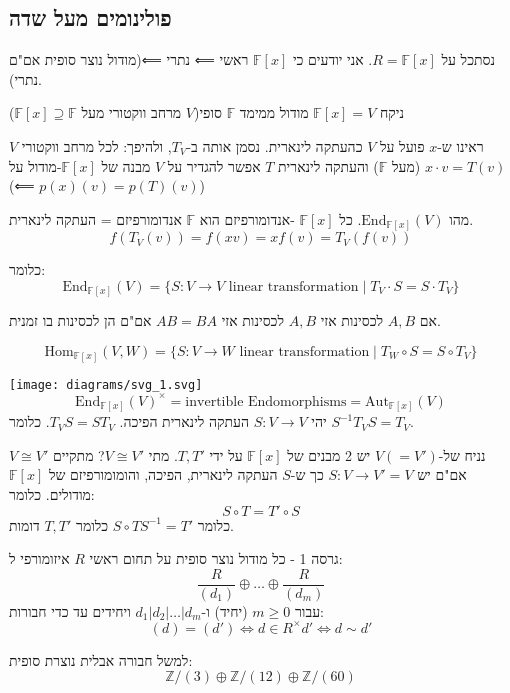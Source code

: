 \documentclass{tstextbook}
\begin{document}
\subsection{פולינומים מעל שדה}

נסתכל על \(R=\mathbb{F}[x]\). אני יודעים כי \(\mathbb{F}[x]\) ראשי ⟸ נתרי ⟸(מודול נוצר סופית אם"ם נתרי).

ניקח \(\mathbb{F}[x]=V\) מודול ממימד \(\mathbb{F}\) סופי(\(V\) מרחב ווקטורי מעל \(\mathbb{F}[x]\supseteq \mathbb{F}\))

ראינו ש-\(x\) פועל על \(V\) כהעתקה לינארית. נסמן אותה ב-\(T_{V}\), ולהיפך:
לכל מרחב ווקטורי \(V\) (מעל \(\mathbb{F}\)) והעתקה לינארית \(T\) אפשר להגדיר על \(V\) מבנה של \(\mathbb{F}[x]\)-מודול על \(x\cdot v=T(v)\)(⟸ \(p(x)(v)=p(T)(v)\))

מהו \(\mathrm{End}_{\mathbb{F}[x]}(V)\). כל \(\mathbb{F}[x]\) -אנדומורפיזם הוא \(\mathbb{F}\) אנדומורפיזם = העתקה לינארית.
$$f(T_{V}(v))=f(xv)=xf(v)=T_{V}(f(v))$$

כלומר:
$$\text{End}_{\mathbb{F} [x]}(V)=\{ S:V\to V \text{ linear transformation} \mid  T_{V}\cdot S = S\cdot T_{V}\}$$

\begin{proposition}
אם \(A,B\) לכסינות אזי \(A,B\) לכסינות אזי \(AB=BA\) אם"ם הן לכסינות בו זמנית.

$$\mathrm{Hom}_{\mathbb{F}[x] }(V,W)=\{ S:V\to W \text{ linear transformation}\mid  T_{W}\circ  S = S\circ  T_{V} \}$$

\texttt{[image: diagrams/svg\_1.svg]}
$$\mathrm{End}_{\mathbb{F} [x]}(V)^{\times}=\text{invertible Endomorphisms} = \mathrm{Aut}_{\mathbb{F} [x]}(V)$$
יהי \(S:V\to V\) העתקה לינארית הפיכה. \(T_{V}S=ST_{V}\).  כלומר \(S^{-1}T_{V}S=T_{V}\).

\end{proposition}
נניח של-\(V(=V')\) יש 2 מבנים של \(\mathbb{F} [x]\) על ידי \(T,T'\). מתי \(V\cong V'\)?
מתקיים \(V\cong V'\) אם"ם יש \(S:V\to V'=V\) כך ש-\(S\) העתקה לינארית, הפיכה, והומומורפיזם של \(\mathbb{F}[x]\) מודולים. כלומר:
$$S\circ  T=T'\circ  S$$
כלומר \(S\circ T S^{-1} = T'\) כלומר \(T,T'\) דומות.

\begin{proposition}
גרסה 1 - כל מודול נוצר סופית על תחום ראשי \(R\) איזומורפי ל:
$$\frac{R}{(d_{1})}\oplus \dots \oplus \frac{R}{(d_{m})}$$
עבור \(m\geq 0\) (יחיד) ו-\(d_{1}|d_{2}|\dots|d_{m}\) ויחידים עד כדי חבורות:
$$(d)=(d')\iff d \in R^{\times}d'\iff d \sim  d'$$

\end{proposition}
למשל חבורה אבלית נוצרת סופית:
$$\mathbb{Z} / (3) \oplus \mathbb{Z} / (12) \oplus \mathbb{Z} / (60)$$
\end{document}
